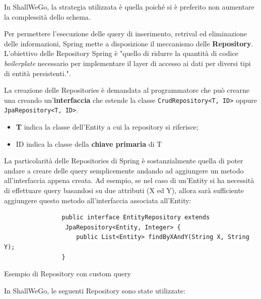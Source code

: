        In ShallWeGo, la strategia utilizzata è quella  poiché si è preferito non aumentare la complessità dello schema.

        Per permettere l'esecuzione delle query di inserimento, retrival ed eliminazione delle informazioni, Spring mette a disposizione il meccanismo delle \textbf{Repository}. L'obiettivo delle Repository Spring è "quello di ridurre la quantità di codice \textit{boilerplate} necessario per implementare il layer di accesso ai dati per diversi tipi di entità persistenti.".

        La creazione delle Repositories è demandata al programmatore che può crearne una creando un'\textbf{interfaccia} che estende la classe \texttt{CrudRepository<T, ID>} oppure \\ \texttt{JpaRepository<T, ID>}.

        \begin{itemize}
            \item \textbf{T} indica la classe dell'Entity a cui la repository si riferisce;
            \item ID indica la classe della \textbf{chiave primaria} di T
        \end{itemize}

        La particolarità delle Repositories di Spring è sostanzialmente quella di poter andare a creare delle query semplicemente andando ad aggiungere un metodo all'interfaccia appena creata. Ad esempio, se nel caso di un'Entity si ha necessità di effettuare query basandosi su due attributi (X ed Y), allora sarà sufficiente aggiungere questo metodo all'interfaccia associata all'Entity:

        \begin{code}
            \begin{verbatim}
                public interface EntityRepository extends
                 JpaRepository<Entity, Integer> {
                    public List<Entity> findByXAndY(String X, String Y);
                }
            \end{verbatim}
            \caption{Esempio di Repository con custom query}
        \end{code}

        In ShallWeGo, le seguenti Repository sono state utilizzate:

